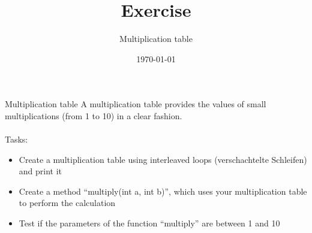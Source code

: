 


\title{Exercise}
\subtitle{Multiplication table}
\date{\today}




\begin{frame}
    \titlepage
\end{frame}

\begin{frame}{Multiplication table}
    A multiplication table provides the values of small multiplications (from 1 to 10) in a clear fashion.\\\\
    Tasks:
    \begin{itemize}
        \item Create a multiplication table using interleaved loops (verschachtelte Schleifen) and print it
        \item Create a method ``multiply(int a, int b)'', which uses your multiplication table to perform the calculation
        \item Test if the parameters of the function ``multiply'' are between 1 and 10
    \end{itemize}
\end{frame}



